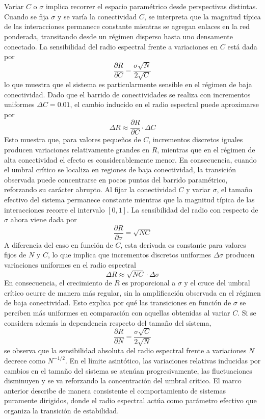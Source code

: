 \\
\\
Variar $C$ o $\sigma$ implica recorrer el espacio paramétrico desde perspectivas distintas. Cuando se fija $\sigma$ y se varía la conectividad $C$, se interpreta que la magnitud típica de las interacciones permanece constante mientras se agregan enlaces en la red ponderada, transitando desde un régimen disperso hasta uno densamente conectado. La sensibilidad del radio espectral frente a variaciones en $C$ está dada por
$$\frac{\partial R}{\partial C}=\frac{\sigma\sqrt{N}}{2\sqrt{C}}$$
lo que muestra que el sistema es particularmente sensible en el régimen de baja conectividad. Dado que el barrido de conectividades se realiza con incrementos uniformes $\Delta C=0.01$, el cambio inducido en el radio espectral puede aproximarse por 
$$\Delta R\approx \frac{\partial R}{\partial C}\cdot\Delta C$$
Esto muestra que, para valores pequeños de $C$, incrementos discretos iguales producen variaciones relativamente grandes en $R$, mientras que en el régimen de alta conectividad el efecto es considerablemente menor. En consecuencia, cuando el umbral crítico se localiza en regiones de baja conectividad, la transición observada puede concentrarse en pocos puntos del barrido paramétrico, reforzando su carácter abrupto. Al fijar la conectividad $C$ y variar $\sigma$, el tamaño efectivo del sistema permanece constante mientras que la magnitud típica de las interacciones recorre el intervalo $[0,1]$. La sensibilidad del radio con respecto de $\sigma$ ahora viene dada por 
$$\frac{\partial R}{\partial \sigma}=\sqrt{NC}$$
A diferencia del caso en función de $C$, esta derivada es constante para valores fijos de $N$ y $C$, lo que implica que incrementos discretos uniformes $\Delta\sigma$ producen variaciones uniformes en el radio espectral 
$$\Delta R\approx\sqrt{NC}\cdot\Delta\sigma$$
En consecuencia, el crecimiento de $R$ es proporcional a $\sigma$ y el cruce del umbral crítico ocurre de manera más regular, sin la amplificación observada en el régimen de baja conectividad. Esto explica por qué las transiciones en función de $\sigma$ se perciben más uniformes en comparación con aquellas obtenidas al variar $C$. Si se considera además la dependencia respecto del tamaño del sistema,
$$\frac{\partial R}{\partial N}=\frac{\sigma\sqrt{C}}{2\sqrt{N}}$$
se observa que la sensibilidad absoluta del radio espectral frente a variaciones $N$ decrece como $N^{-1/2}$. En el límite asintótico, las variaciones relativas inducidas por cambios en el tamaño del sistema se atenúan progresivamente, las fluctuaciones disminuyen y se va reforzando la concentración del umbral crítico. El marco anterior describe de manera consistente el comportamiento de sistemas puramente dirigidos, donde el radio espectral actúa como parámetro efectivo que organiza la transición de estabilidad. \\
